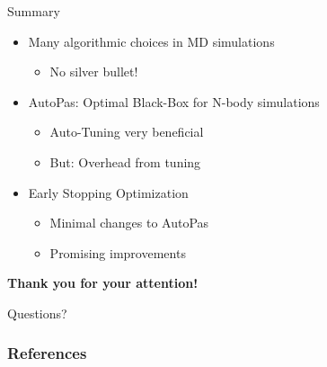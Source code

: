 \documentclass[
	10pt,
	t		%
]{beamer}
\begin{document}
\begin{frame}{Summary}
    \begin{itemize}
        \item Many algorithmic choices in MD simulations
              \begin{itemize}
                  \item No silver bullet!
              \end{itemize}
        \item AutoPas: Optimal Black-Box for N-body simulations
              \begin{itemize}
                  \item Auto-Tuning very beneficial
                  \item But: Overhead from tuning
              \end{itemize}
        \item Early Stopping Optimization
              \begin{itemize}
                  \item Minimal changes to AutoPas
                  \item Promising improvements
              \end{itemize}
    \end{itemize}
\end{frame}



\begin{frame}
    \begin{center}
        \vspace{1cm}
        {\large \textbf{Thank you for your attention!}}

        \vspace{2cm}

        \Huge{Questions?}
    \end{center}
\end{frame}




\begin{frame}
    \frametitle{References}
    \footnotesize
    
    
\end{frame}

\appendix
\end{document}
